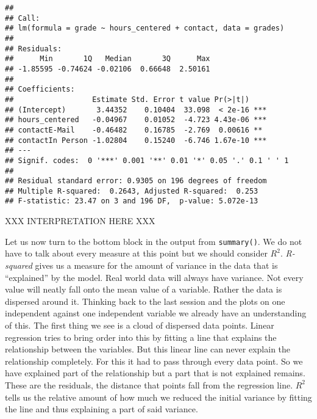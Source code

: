 \documentclass[
]{book}
\begin{document}
\begin{verbatim}
## 
## Call:
## lm(formula = grade ~ hours_centered + contact, data = grades)
## 
## Residuals:
##      Min       1Q   Median       3Q      Max 
## -1.85595 -0.74624 -0.02106  0.66648  2.50161 
## 
## Coefficients:
##                  Estimate Std. Error t value Pr(>|t|)    
## (Intercept)       3.44352    0.10404  33.098  < 2e-16 ***
## hours_centered   -0.04967    0.01052  -4.723 4.43e-06 ***
## contactE-Mail    -0.46482    0.16785  -2.769  0.00616 ** 
## contactIn Person -1.02804    0.15240  -6.746 1.67e-10 ***
## ---
## Signif. codes:  0 '***' 0.001 '**' 0.01 '*' 0.05 '.' 0.1 ' ' 1
## 
## Residual standard error: 0.9305 on 196 degrees of freedom
## Multiple R-squared:  0.2643, Adjusted R-squared:  0.253 
## F-statistic: 23.47 on 3 and 196 DF,  p-value: 5.072e-13
\end{verbatim}

XXX INTERPRETATION HERE XXX

Let us now turn to the bottom block in the output from \texttt{summary()}. We do not
have to talk about every measure at this point but we should consider \(R^2\).
\emph{R-squared} gives us a measure for the amount of variance in the data that is
``explained'' by the model. Real world data will always have variance. Not every
value will neatly fall onto the mean value of a variable. Rather the data is
dispersed around it. Thinking back to the last session and the plots on one
independent against one independent variable we already have an understanding
of this. The first thing we see is a cloud of dispersed data points. Linear
regression tries to bring order into this by fitting a line that explains the
relationship between the variables. But this linear line can never explain the
relationship completely. For this it had to pass through every data point. So we
have explained part of the relationship but a part that is not explained
remains. These are the residuals, the distance that points fall from the
regression line. \(R^2\) tells us the relative amount of how much we reduced the
initial variance by fitting the line and thus explaining a part of said
variance.
\end{document}
